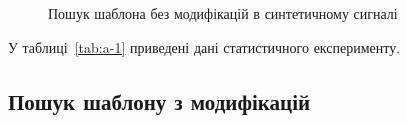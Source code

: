 \begin{figure}[!h]
            \caption{Пошук шаблона без модифікацій в синтетичному сигналі}\label{fig:a-3}
        \end{figure}
        У таблиці~\ref{tab:a-1} приведені дані статистичного експерименту.

    \subsection{Пошук шаблону з модифікацій}
